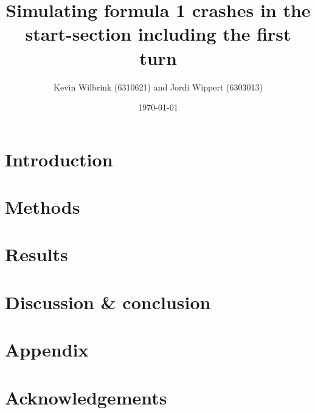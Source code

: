 \documentclass[12pt]{article}
\title{\textbf{Simulating formula 1 crashes in the start-section including the first turn}}
\date{\today}
\author{Kevin Wilbrink (6310621) and Jordi Wippert (6303013)}
\begin{document}
	\maketitle

	\begin{multicols*}{2}
			\textbf{}


		\section{Introduction}
		

		\section{Methods}
		

		\section{Results}
		

    \section{Discussion \& conclusion}
		

		\section*{Appendix}
		

		\section*{Acknowledgements}
		

		
	\end{multicols*}
\end{document}
